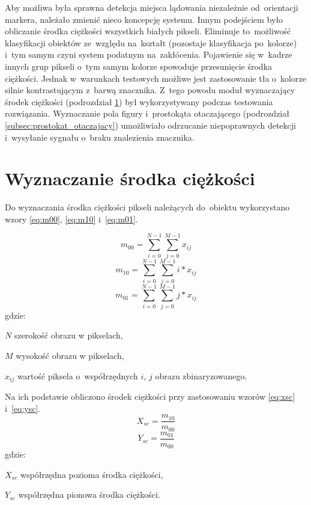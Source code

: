 Aby możliwa była sprawna detekcja miejsca lądowania niezależnie od~orientacji markera, należało zmienić nieco koncepcję systemu. 
Innym podejściem było obliczanie środka ciężkości wszystkich białych pikseli. 
Eliminuje to~możliwość klasyfikacji obiektów ze~względu na~kształt (pozostaje klasyfikacja po~kolorze) i~tym samym czyni system podatnym na~zakłócenia. 
Pojawienie się w~kadrze innych grup pikseli o~tym samym kolorze spowoduje przesunięcie środka ciężkości.
Jednak w~warunkach testowych możliwe jest zastosowanie tła o~kolorze silnie kontrastującym z~barwą znacznika. 
Z~tego powodu moduł wyznaczający środek ciężkości (podrozdział \ref{subsec:srodek_ciezosci}) był wykorzystywany podczas testowania rozwiązania.
Wyznaczanie pola figury i~prostokąta otaczającego (podrozdział \ref{subsec:prostokat_otaczajacy}) umożliwiało odrzucanie niepoprawnych detekcji i~wysyłanie sygnału o~braku znalezienia znacznika. 


\section{Wyznaczanie środka ciężkości}
\label{subsec:srodek_ciezosci}

Do wyznaczania środka ciężkości pikseli należących do~obiektu wykorzystano wzory \eqref{eq:m00}, \eqref{eq:m10} i~\eqref{eq:m01}.

\begin{equation}
\label{eq:m00}
m_{00}=\sum_{i=0}^{N-1}\sum_{j=0}^{M-1} x_{ij}
\end{equation}
\begin{equation}
\label{eq:m10}
m_{10}=\sum_{i=0}^{N-1}\sum_{j=0}^{M-1} i*x_{ij}
\end{equation}
\begin{equation}
\label{eq:m01}
m_{01}=\sum_{i=0}^{N-1}\sum_{j=0}^{M-1} j*x_{ij}
\end{equation}
gdzie:
\begin{eqwhere}[2cm]
	\item[$N$] szerokość obrazu w pikselach,
	\item[$M$] wysokość obrazu w pikselach,
	\item[$x_{ij}$] wartość piksela o~współrzędnych $i$, $j$ obrazu zbinaryzowanego.
\end{eqwhere}
Na ich podstawie obliczono środek ciężkości przy zastosowaniu wzorów \eqref{eq:xsc} i~\eqref{eq:ysc}.
\begin{equation}
\label{eq:xsc}
X_{sc}=\frac{m_{10}}{m_{00}}
\end{equation}
\begin{equation}
\label{eq:ysc}
Y_{sc}=\frac{m_{01}}{m_{00}}
\end{equation}
gdzie:
\begin{eqwhere}[2cm]
	\item[$X_{sc}$] współrzędna pozioma środka ciężkości,
	\item[$Y_{sc}$] współrzędna pionowa środka ciężkości.
\end{eqwhere}


